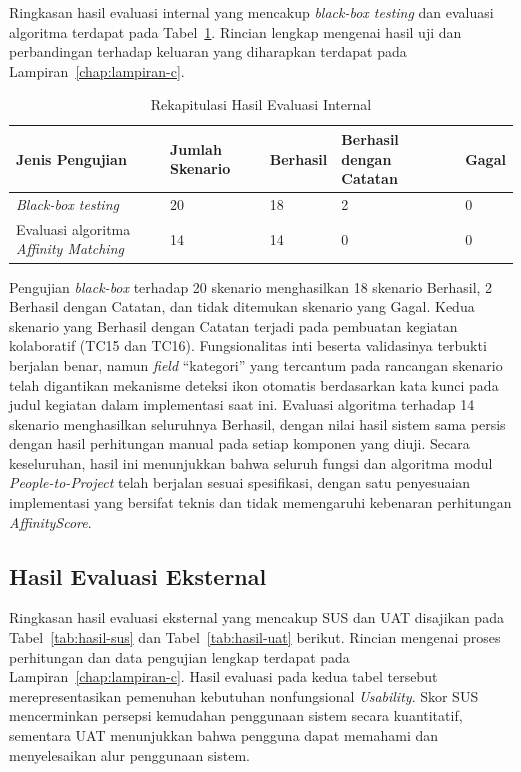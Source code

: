 Ringkasan hasil evaluasi internal yang mencakup \emph{black-box testing} dan evaluasi algoritma terdapat pada Tabel~\ref{tab:hasil-internal}. Rincian lengkap mengenai hasil uji dan perbandingan terhadap keluaran yang diharapkan terdapat pada Lampiran~\ref{chap:lampiran-c}.

\begin{table}[H]
  \caption{Rekapitulasi Hasil Evaluasi Internal}
  \label{tab:hasil-internal}
  \begin{tabularx}{\textwidth}{p{4.5cm} p{1.5cm} p{1.5cm} p{3cm} X}
    \toprule
    \textbf{Jenis Pengujian} & \textbf{Jumlah Skenario} & \textbf{Berhasil} & \textbf{Berhasil dengan Catatan} & \textbf{Gagal} \\
    \midrule
    \emph{Black-box testing} & 20 & 18 & 2 & 0 \\
    \midrule
    Evaluasi algoritma \emph{Affinity Matching} & 14 & 14 & 0 & 0 \\
    \bottomrule
  \end{tabularx}
\end{table}

Pengujian \emph{black-box} terhadap 20 skenario menghasilkan 18 skenario Berhasil, 2 Berhasil dengan Catatan, dan tidak ditemukan skenario yang Gagal. Kedua skenario yang Berhasil dengan Catatan terjadi pada pembuatan kegiatan kolaboratif (TC15 dan TC16). Fungsionalitas inti beserta validasinya terbukti berjalan benar, namun \emph{field} ``kategori'' yang tercantum pada rancangan skenario telah digantikan mekanisme deteksi ikon otomatis berdasarkan kata kunci pada judul kegiatan dalam implementasi saat ini. Evaluasi algoritma terhadap 14 skenario menghasilkan seluruhnya Berhasil, dengan nilai hasil sistem sama persis dengan hasil perhitungan manual pada setiap komponen yang diuji. Secara keseluruhan, hasil ini menunjukkan bahwa seluruh fungsi dan algoritma modul \emph{People-to-Project} telah berjalan sesuai spesifikasi, dengan satu penyesuaian implementasi yang bersifat teknis dan tidak memengaruhi kebenaran perhitungan \emph{AffinityScore}.

\subsection{Hasil Evaluasi Eksternal}

Ringkasan hasil evaluasi eksternal yang mencakup SUS dan UAT disajikan pada Tabel~\ref{tab:hasil-sus} dan Tabel~\ref{tab:hasil-uat} berikut. Rincian mengenai proses perhitungan dan data pengujian lengkap terdapat pada Lampiran~\ref{chap:lampiran-c}. Hasil evaluasi pada kedua tabel tersebut merepresentasikan pemenuhan kebutuhan nonfungsional \emph{Usability}. Skor SUS mencerminkan persepsi kemudahan penggunaan sistem secara kuantitatif, sementara UAT menunjukkan bahwa pengguna dapat memahami dan menyelesaikan alur penggunaan sistem.

